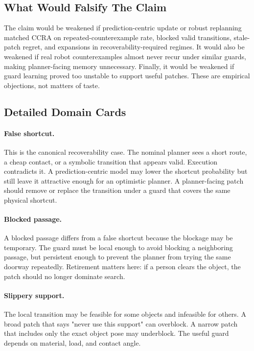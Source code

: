 \documentclass{article}
\newcommand{\ccra}{\textsc{CCRA}}
\begin{document}
\subsection{What Would Falsify The Claim}

The claim would be weakened if prediction-centric update or robust replanning
matched \ccra{} on repeated-counterexample rate, blocked valid transitions,
stale-patch regret, and expansions in recoverability-required regimes. It would
also be weakened if real robot counterexamples almost never recur under similar
guards, making planner-facing memory unnecessary. Finally, it would be weakened
if guard learning proved too unstable to support useful patches. These are
empirical objections, not matters of taste.

\subsection{Detailed Domain Cards}

\paragraph{False shortcut.}
This is the canonical recoverability case. The nominal planner sees a short
route, a cheap contact, or a symbolic transition that appears valid. Execution
contradicts it. A prediction-centric model may lower the shortcut probability
but still leave it attractive enough for an optimistic planner. A planner-facing
patch should remove or replace the transition under a guard that covers the
same physical shortcut.

\paragraph{Blocked passage.}
A blocked passage differs from a false shortcut because the blockage may be
temporary. The guard must be local enough to avoid blocking a neighboring
passage, but persistent enough to prevent the planner from trying the same
doorway repeatedly. Retirement matters here: if a person clears the object, the
patch should no longer dominate search.

\paragraph{Slippery support.}
The local transition may be feasible for some objects and infeasible for
others. A broad patch that says "never use this support" can overblock. A
narrow patch that includes only the exact object pose may underblock. The useful
guard depends on material, load, and contact angle.
\end{document}
